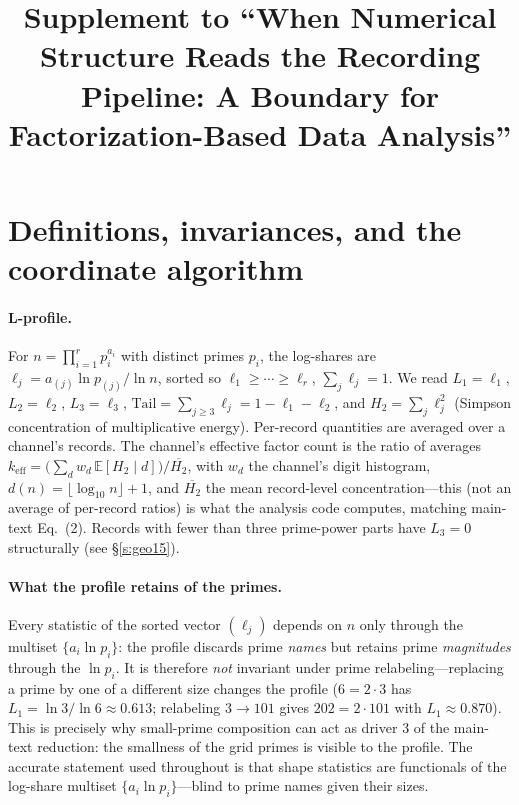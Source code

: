 \documentclass[12pt]{article}
\title{Supplement to ``When Numerical Structure Reads the Recording Pipeline:
A Boundary for Factorization-Based Data Analysis''}
\author{}  %
\date{}
\newcommand{\keff}{k_{\mathrm{eff}}}
\begin{document}
\maketitle

\section{Definitions, invariances, and the coordinate algorithm}
\label{s:defs}

\paragraph{L-profile.}
For $n = \prod_{i=1}^r p_i^{a_i}$ with distinct primes $p_i$, the log-shares
are $\ell_j = a_{(j)} \ln p_{(j)} / \ln n$, sorted so
$\ell_1 \ge \cdots \ge \ell_r$, $\sum_j \ell_j = 1$. We read
$L_1 = \ell_1$, $L_2 = \ell_2$, $L_3 = \ell_3$,
$\mathrm{Tail} = \sum_{j \ge 3} \ell_j = 1 - \ell_1 - \ell_2$, and
$H_2 = \sum_j \ell_j^2$ (Simpson concentration of multiplicative energy).
Per-record quantities are averaged over a channel's records. The channel's effective
factor count is the ratio of averages
$\keff = \big(\sum_d w_d\, \mathbb{E}[H_2 \mid d]\big) / \overline{H_2}$,
with $w_d$ the channel's digit histogram,
$d(n) = \lfloor \log_{10} n \rfloor + 1$, and $\overline{H_2}$ the mean
record-level concentration---this (not an average of per-record ratios) is
what the analysis code computes, matching main-text Eq.~(2).
Records with fewer than three prime-power parts have $L_3 = 0$ structurally
(see \S\ref{s:geo15}).

\paragraph{What the profile retains of the primes.}
Every statistic of the sorted vector $(\ell_j)$ depends on $n$ only through
the multiset $\{a_i \ln p_i\}$: the profile discards prime \emph{names}
but retains prime \emph{magnitudes} through the $\ln p_i$. It is therefore
\emph{not} invariant under prime relabeling---replacing a prime by one of a
different size changes the profile ($6 = 2\cdot3$ has
$L_1 = \ln 3/\ln 6 \approx 0.613$; relabeling $3 \to 101$ gives
$202 = 2\cdot101$ with $L_1 \approx 0.870$). This is precisely why
small-prime composition can act as driver 3 of the main-text reduction: the
smallness of the grid primes is visible to the profile. The accurate
statement used throughout is that shape statistics are functionals of the
log-share multiset $\{a_i \ln p_i\}$---blind to prime names given their
sizes.
\end{document}
